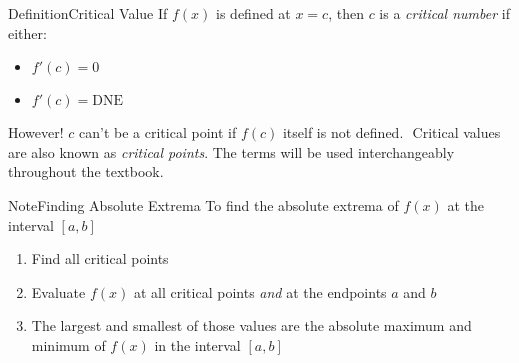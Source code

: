 \documentclass{MathNotes}
\newenvironment{definition}[1]{\begin{RedBox}{Definition}{#1}}{\end{RedBox}}
\newenvironment{note}[1]{\begin{YellowBox}{Note}{#1}}{\end{YellowBox}}
\begin{document}
\newpage
\begin{multicols}{2}
\begin{definition}{Critical Value}
    If $f(x)$ is defined at $x=c$, then $c$ is a \textit{critical number} if
    either:
    \begin{multicols}{2}
        \begin{itemize}
            \item $f'(c)=0$
            \item $f'(c)=\text{DNE}$
        \end{itemize}
    \end{multicols}
    However! $c$ can't be a critical point if $f(c)$ itself is not defined.
    \newline$ $\newline %
    Critical values are also known as \textit{critical points}. The terms will
    be used interchangeably throughout the textbook.
\end{definition}
    \begin{note}{Finding Absolute Extrema}
        To find the absolute extrema of $f(x)$ at the interval $[a, b]$
        \begin{enumerate}
            \item Find all critical points
            \item Evaluate $f(x)$ at all critical points \textit{and} at the
                endpoints $a$ and $b$
            \item The largest and smallest of those values are the absolute
                maximum and minimum of $f(x)$ in the interval $[a, b]$
        \end{enumerate}
    \end{note}
\end{multicols}
\end{document}
